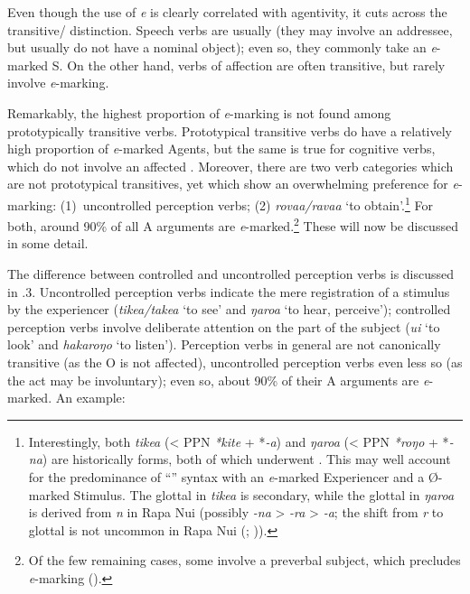 Even though the use of \textit{e} is clearly correlated with agentivity, it cuts across the transitive/ distinction. Speech verbs are usually  (they may involve an addressee, but usually do not have a nominal object); even so, they commonly take an \textit{e}{}-marked S. On the other hand, verbs of affection are often transitive, but rarely involve \textit{e}{}-marking.

Remarkably, the highest proportion of \textit{e}{}-marking is not found among prototypically transitive verbs. Prototypical transitive verbs do have a relatively high proportion of \textit{e}{}-marked Agents, but the same is true for cognitive verbs, which do not involve an affected . Moreover, there are two verb categories which are not prototypical transitives, yet which show an overwhelming preference for \textit{e}{}-marking: (1)~uncontrolled perception verbs; (2) \textit{rova{\ꞌ}a}\textit{/rava{\ꞌ}a} ‘to obtain’.\footnote{\label{fn:396}Interestingly, both \textit{tike{\ꞌ}a} ({\textless} PPN \textit{*kite} + *\textit{-a}) and \textit{ŋaro{\ꞌ}a} ({\textless} PPN \textit{*roŋo} + *\textit{-na}) are historically  forms, both of which underwent . This may well account for the predominance of “” syntax with an \textit{e}{}-marked Experiencer and a Ø-marked Stimulus. The glottal in \textit{tike{\ꞌ}a} is secondary, while the glottal in \textit{ŋaro{\ꞌ}a} is derived from \textit{n} in Rapa Nui (possibly \textit{-na} {\textgreater} \textit{-ra} {\textgreater} \textit{-{\ꞌ}a}; the shift from \textit{r} to glottal is not uncommon in Rapa Nui (; \citealt{Davletshin2015})).} For both, around 90\% of all A arguments are \textit{e}{}-marked.\footnote{\label{fn:397}Of the few remaining cases, some involve a preverbal subject, which precludes \textit{e}{}-marking ().} These will now be discussed in some detail.

The difference between controlled and uncontrolled perception verbs is discussed in .3. Uncontrolled perception verbs indicate the mere registration of a stimulus by the experiencer (\textit{tike{\ꞌ}a/take{\ꞌ}a} ‘to see’  
and \textit{ŋaro{\ꞌ}a} ‘to hear, perceive’);  
controlled perception verbs involve deliberate attention on the part of the subject (\textit{u{\ꞌ}i} ‘to look’ and \textit{hakaroŋo} ‘to listen’). Perception verbs in general are not canonically transitive (as the O is not affected), uncontrolled perception verbs even less so (as the act may be involuntary); even so, about 90\% of their A arguments are \textit{e}{}-marked. An example:

